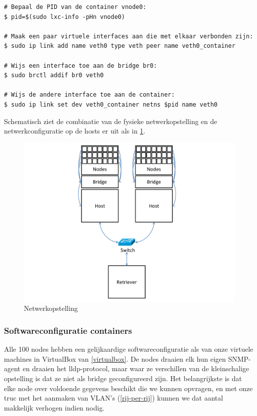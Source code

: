 \begin{lstlisting}[caption={Linux containers verbinden met een bridge\cite{lxc-config}}]
# Bepaal de PID van de container vnode0:
$ pid=$(sudo lxc-info -pHn vnode0)

# Maak een paar virtuele interfaces aan die met elkaar verbonden zijn:
$ sudo ip link add name veth0 type veth peer name veth0_container

# Wijs een interface toe aan de bridge br0:
$ sudo brctl addif br0 veth0

# Wijs de andere interface toe aan de container:
$ sudo ip link set dev veth0_container netns $pid name veth0
\end{lstlisting}

Schematisch ziet de combinatie van de fysieke netwerkopstelling en de netwerkconfiguratie op de hosts er uit als in \cref{fig-vwall-opstelling}.

\begin{figure}[h]
	\centering
	\includegraphics[scale=0.50]{figures/virtual-wall-opstelling}
	\caption{Netwerkopstelling \vwall{}}
	\label{fig-vwall-opstelling}
\end{figure}



\subsubsection{Softwareconfiguratie containers}

Alle 100 nodes hebben een gelijkaardige softwareconfiguratie als van onze virtuele machines in VirtualBox van \cref{virtualbox}.
De nodes draaien elk hun eigen SNMP-agent en draaien het \gls{lldp}-protocol,
maar waar ze verschillen van de kleinschalige opstelling is dat ze niet als bridge geconfigureerd zijn.
Het belangrijkste is dat elke node over voldoende gegevens beschikt die we kunnen opvragen,
en met onze truc met het aanmaken van VLAN's (\cref{rij-per-rij}) kunnen we dat aantal makkelijk verhogen indien nodig.


